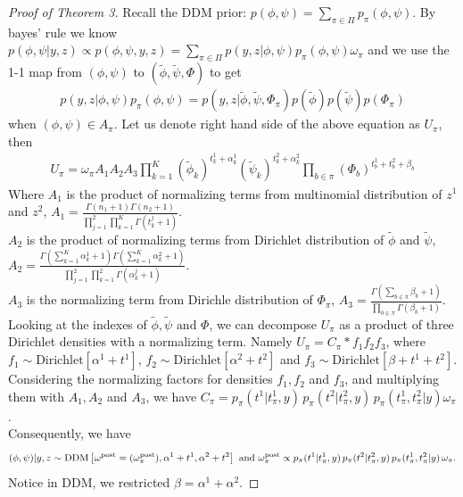 \documentclass[aoas,preprint]{imsart}
\begin{document}
\begin{proof}[Proof of Theorem 3]
Recall the DDM prior: $p(\phi,\psi) = \sum_{\pi \in \Pi} p_\pi(\phi,\psi)$. 
By bayes' rule we know $p(\phi,\psi | y,z) \propto p(\phi,\psi, y, z) = \sum_{\pi \in \Pi}  p(y, z | \phi,\psi) p_\pi(\phi,\psi)\omega_\pi$
and we use the 1-1 map from $(\phi,\psi)$ to $(\tilde \phi, \tilde \psi, \Phi)$ to get
\begin{eqnarray*}
p(y, z | \phi,\psi) p_\pi(\phi,\psi) = p(y, z | \tilde{\phi} , \tilde{\psi}, \Phi_\pi) p(\tilde{\phi}) p (\tilde{\psi}) p(\Phi_\pi)
\end{eqnarray*}
when $(\phi,\psi) \in A_\pi$.
Let us denote right hand side of the above equation as $U_\pi$, then
\begin{eqnarray*}
U_\pi = \omega_\pi A_1 A_2 A_3\prod_{k = 1}^K (\tilde{ \phi }_k)^{t_k^1 + \alpha_k^1} (\tilde{ \psi }_k)^{t_k^2 + \alpha_k^2}   \prod_{b \in \pi} (\Phi_b)^{t_b^1 + t_b^2 + \beta_b}
\end{eqnarray*}
Where $A_1$ is the product of normalizing terms from multinomial distribution of $z^1$ and $z^2$, $A_1 =  \frac{\Gamma(n_1 + 1)\Gamma(n_2 + 1)}{\prod_{j = 1}^2\prod_{k = 1}^K \Gamma(t_k^j + 1) } $.\\
$A_2$ is the product of normalizing terms from Dirichlet distribution of $\tilde{\phi}$ and $\tilde{\psi}$,
$A_2 = \frac{ \Gamma( \sum_{k = 1}^K \alpha_k^1 + 1)  \Gamma( \sum_{k = 1}^K \alpha_k^2 + 1)}{ \prod_{j = 1}^2 \prod_{k = 1}^2 \Gamma(\alpha_k^j + 1)}$.\\
$A_3$ is the normalizing term from Dirichle distribution of $\Phi_\pi$, $A_3 = \frac{\Gamma(\sum_{b \in \pi } \beta_b + 1)}{\prod_{b\in \pi} \Gamma(\beta_b + 1)}$.\\
Looking at the indexes of $\tilde \phi, \tilde \psi \text{ and } \Phi$, we can decompose $U_\pi$ as a product of three Dirichlet densities with a normalizing term. 
Namely $U_\pi = C_\pi * f_1 f_2 f_3$, where
$f_1 \sim \text{Dirichlet}[\alpha^1 + t^1]$, $f_2 \sim \text{Dirichlet}[\alpha^2 + t^2]$ and $f_3 \sim \text{Dirichlet}[\beta + t^1 + t^2]$.
Considering the normalizing factors for densities $f_1,f_2$ and $f_3$, and multiplying them with $A_1, A_2$ and $A_3$,
we have $C_\pi =  p_\pi(t^1 | t^1_{\pi},y)\, p_\pi(t^2|  t^2_{\pi},y )
 \, p_\pi( t^1_{\pi}, t^2_{\pi} | y ) \omega_\pi$. \\
 Consequently, we have 
 \begin{eqnarray*}
 (\phi,\psi)|y,z  \sim {\mbox {\rm DDM}}\left[ \omega^{\rm post}=(\omega^{\rm post}_\pi), \alpha^1 + t^1, \alpha^2 + t^2  \right] \text{ and } \omega^{\rm post}_\pi \propto 
 p_\pi(t^1 | t^1_{\pi},y)\, p_\pi(t^2|  t^2_{\pi},y )
 \, p_\pi( t^1_{\pi}, t^2_{\pi} | y ) \, \omega_\pi.
 \end{eqnarray*}
 Notice in DDM, we restricted $\beta = \alpha^1 + \alpha^2$.

\end{proof}
\end{document}
